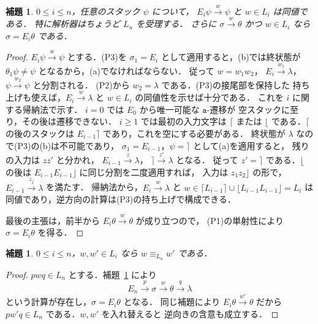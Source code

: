 \documentclass[11pt,a4paper]{ltjsarticle}
\newtheorem{lemma}[theorem]{補題}
\theoremstyle{remark}
\theoremstyle{plain}
\begin{document}
\begin{lemma}\label{lem:app-recognition}
$0\le i\le n$，任意のスタック $\psi$ について，
$E_i\psi\xrightarrow{w}\psi$ と $w\in L_i$ は同値である．
特に解析器はちょうど $L_n$ を受理する．
さらに $\sigma\xrightarrow{w}\theta$ かつ $w\in L_i$ なら
$\sigma=E_i\theta$ である．
\end{lemma}
\begin{proof}
$E_i\psi\xrightarrow{w}\psi$ とする．(P3)を
$\sigma_1=E_i$ として適用すると，(b)では終状態が
$\theta_1\psi\ne\psi$ となるから，(a)でなければならない．
従って $w=w_1w_2$，
$E_i\xrightarrow{w_1}\lambda$，
$\psi\xrightarrow{w_2}\psi$ と分割される．
(P2)から $w_2=\lambda$ である．(P3)の接尾部を保持した
持ち上げも使えば，$E_i\xrightarrow{w}\lambda$ と
$w\in L_i$ の同値性を示せば十分である．
これを $i$ に関する帰納法で示す．
$i=0$ では $E_0$ から唯一可能な $\mathtt a$-遷移が
空スタックに至り，その後は遷移できない．
$i\ge1$ では最初の入力文字は $\lceil$ または
$\lfloor$ である．$\lceil$ の後のスタックは
$E_{i-1}\rceil$ であり，これを空にする必要がある．
終状態が $\lambda$ なので(P3)の(b)は不可能であり，
$\sigma_1=E_{i-1}$，$\psi=\rceil$ として(a)を適用すると，
残りの入力は $zz'$ と分かれ，
$E_{i-1}\xrightarrow{z}\lambda$，
$\rceil\xrightarrow{z'}\lambda$ となる．
従って $z'=\rceil$ である．$\lfloor$ の後は
$E_{i-1}E_{i-1}\rfloor$ に同じ分割を二度適用すれば，
入力は $z_1z_2\rfloor$ の形で，
$E_{i-1}\xrightarrow{z_j}\lambda$ を満たす．
帰納法から，$E_i\xrightarrow{w}\lambda$ と
$w\in\lceil{}L_{i-1}\rceil\cup\lfloor{}L_{i-1}L_{i-1}\rfloor=L_i$
は同値であり，逆方向の計算は(P3)の持ち上げで構成できる．

最後の主張は，前半から
$E_i\theta\xrightarrow{w}\theta$ が成り立つので，
(P1)の単射性により $\sigma=E_i\theta$ を得る．
\end{proof}

\begin{lemma}\label{lem:app-complete-subtree-exchange}
$0\le i\le n$，$w,w'\in L_i$ なら
$w\equiv_{L_n}w'$ である．
\end{lemma}
\begin{proof}
$pwq\in L_n$ とする．補題~\ref{lem:app-recognition} により
\[
E_n\xrightarrow{p}\sigma\xrightarrow{w}\theta
\xrightarrow{q}\lambda
\]
という計算が存在し，$\sigma=E_i\theta$ となる．
同じ補題により
$E_i\theta\xrightarrow{w'}\theta$ だから
$pw'q\in L_n$ である．$w,w'$ を入れ替えると
逆向きの含意も成立する．
\end{proof}
\end{document}
